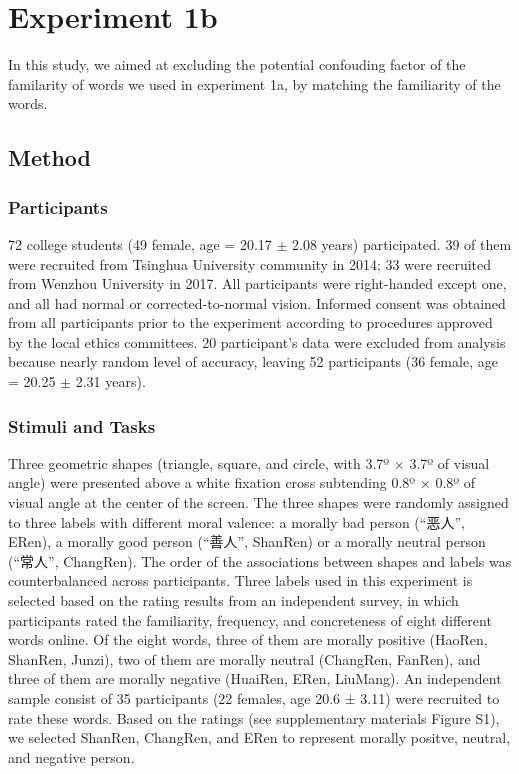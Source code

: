 \documentclass[man]{apa6}
\begin{document}
\hypertarget{experiment-1b}{%
\section{Experiment 1b}\label{experiment-1b}}

In this study, we aimed at excluding the potential confouding factor of the familarity of words we used in experiment 1a, by matching the familiarity of the words.

\hypertarget{method}{%
\subsection{Method}\label{method}}

\hypertarget{participants-1}{%
\subsubsection{Participants}\label{participants-1}}

72 college students (49 female, age = 20.17 \(\pm\) 2.08 years) participated. 39 of them were recruited from Tsinghua University community in 2014; 33 were recruited from Wenzhou University in 2017. All participants were right-handed except one, and all had normal or corrected-to-normal vision. Informed consent was obtained from all participants prior to the experiment according to procedures approved by the local ethics committees. 20 participant's data were excluded from analysis because nearly random level of accuracy, leaving 52 participants (36 female, age = 20.25 \(\pm\) 2.31 years).

\hypertarget{stimuli-and-tasks-1}{%
\subsubsection{Stimuli and Tasks}\label{stimuli-and-tasks-1}}

Three geometric shapes (triangle, square, and circle, with 3.7º × 3.7º of visual angle) were presented above a white fixation cross subtending 0.8º × 0.8º of visual angle at the center of the screen. The three shapes were randomly assigned to three labels with different moral valence: a morally bad person (\enquote{恶人}, ERen), a morally good person (\enquote{善人}, ShanRen) or a morally neutral person (\enquote{常人}, ChangRen). The order of the associations between shapes and labels was counterbalanced across participants.
Three labels used in this experiment is selected based on the rating results from an independent survey, in which participants rated the familiarity, frequency, and concreteness of eight different words online. Of the eight words, three of them are morally positive (HaoRen, ShanRen, Junzi), two of them are morally neutral (ChangRen, FanRen), and three of them are morally negative (HuaiRen, ERen, LiuMang). An independent sample consist of 35 participants (22 females, age 20.6 ± 3.11) were recruited to rate these words. Based on the ratings (see supplementary materials Figure S1), we selected ShanRen, ChangRen, and ERen to represent morally positve, neutral, and negative person.
\end{document}
